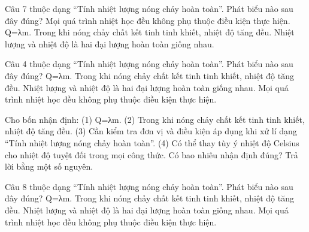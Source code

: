 \begin{ex}
Câu 7 thuộc dạng “Tính nhiệt lượng nóng chảy hoàn toàn”. Phát biểu nào sau đây đúng?
\choice
{Mọi quá trình nhiệt học đều không phụ thuộc điều kiện thực hiện.}
{\True Q=λm.}
{Trong khi nóng chảy chất kết tinh tinh khiết, nhiệt độ tăng đều.}
{Nhiệt lượng và nhiệt độ là hai đại lượng hoàn toàn giống nhau.}
\end{ex}

\begin{ex}
Câu 4 thuộc dạng “Tính nhiệt lượng nóng chảy hoàn toàn”. Phát biểu nào sau đây đúng?
\choice
{\True Q=λm.}
{Trong khi nóng chảy chất kết tinh tinh khiết, nhiệt độ tăng đều.}
{Nhiệt lượng và nhiệt độ là hai đại lượng hoàn toàn giống nhau.}
{Mọi quá trình nhiệt học đều không phụ thuộc điều kiện thực hiện.}
\end{ex}

\begin{ex}
Cho bốn nhận định: (1) Q=λm. (2) Trong khi nóng chảy chất kết tinh tinh khiết, nhiệt độ tăng đều. (3) Cần kiểm tra đơn vị và điều kiện áp dụng khi xử lí dạng “Tính nhiệt lượng nóng chảy hoàn toàn”. (4) Có thể thay tùy ý nhiệt độ Celsius cho nhiệt độ tuyệt đối trong mọi công thức. Có bao nhiêu nhận định đúng? Trả lời bằng một số nguyên.
\end{ex}

\begin{ex}
Câu 8 thuộc dạng “Tính nhiệt lượng nóng chảy hoàn toàn”. Phát biểu nào sau đây đúng?
\choice
{\True Q=λm.}
{Trong khi nóng chảy chất kết tinh tinh khiết, nhiệt độ tăng đều.}
{Nhiệt lượng và nhiệt độ là hai đại lượng hoàn toàn giống nhau.}
{Mọi quá trình nhiệt học đều không phụ thuộc điều kiện thực hiện.}
\end{ex}

